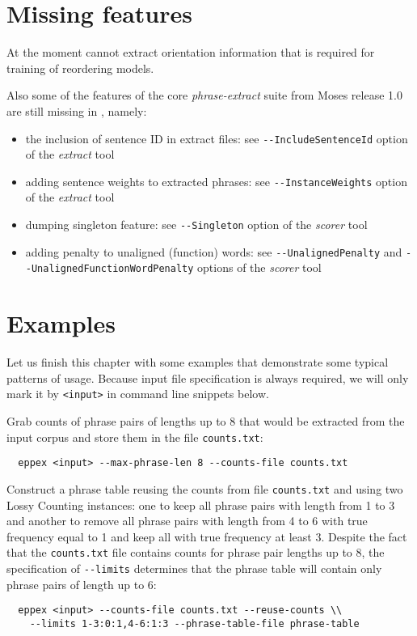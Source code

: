 \section{Missing features}

At the moment \eppex{} cannot extract orientation information that is required for training
of reordering models.

Also some of the features of the core \emph{phrase-extract} suite from Moses
release 1.0 are still missing in \eppex{}, namely:
\begin{itemize}
  \item the inclusion of sentence ID in extract files: see \verb|--IncludeSentenceId|
    option of the \emph{extract} tool
  \item adding sentence weights to extracted phrases: see \verb|--InstanceWeights|
    option of the \emph{extract} tool
  \item dumping singleton feature: see \verb|--Singleton| option of the \emph{scorer} tool
  \item adding penalty to unaligned (function) words: see \verb|--UnalignedPenalty|
    and \verb|--UnalignedFunctionWordPenalty| options of the \emph{scorer} tool
\end{itemize}

\section{Examples}

Let us finish this chapter with some examples that demonstrate some typical
patterns of \eppex{} usage. Because input file specification is always required,
we will only mark it by \verb|<input>| in command line snippets below.

\newpage

Grab counts of phrase pairs of lengths up to 8 that would be extracted from
the input corpus and store them in the file \texttt{counts.txt}:
\begin{verbatim}
  eppex <input> --max-phrase-len 8 --counts-file counts.txt
\end{verbatim}

Construct a phrase table reusing the counts from file \texttt{counts.txt} and using
two Lossy Counting instances: one to keep all phrase pairs with length from
1 to 3 and another to remove all phrase pairs with length from 4 to 6 with true
frequency equal to 1 and keep all with true frequency at least 3. Despite the fact that
the \texttt{counts.txt} file contains counts for phrase pair lengths up to 8,
the specification of \verb|--limits| determines that the phrase table will contain
only phrase pairs of length up to 6:
\begin{verbatim}
  eppex <input> --counts-file counts.txt --reuse-counts \\
    --limits 1-3:0:1,4-6:1:3 --phrase-table-file phrase-table
\end{verbatim}

